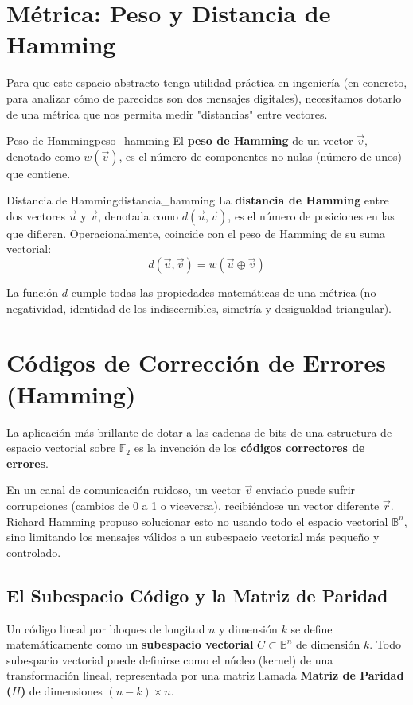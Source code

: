 \section{Métrica: Peso y Distancia de Hamming}

Para que este espacio abstracto tenga utilidad práctica en ingeniería (en concreto, para analizar cómo de parecidos son dos mensajes digitales), necesitamos dotarlo de una métrica que nos permita medir "distancias" entre vectores.

\begin{definicion}{Peso de Hamming}{peso_hamming}
El \textbf{peso de Hamming} de un vector $\vec{v}$, denotado como $w(\vec{v})$, es el número de componentes no nulas (número de unos) que contiene.
\end{definicion}

\begin{definicion}{Distancia de Hamming}{distancia_hamming}
La \textbf{distancia de Hamming} entre dos vectores $\vec{u}$ y $\vec{v}$, denotada como $d(\vec{u}, \vec{v})$, es el número de posiciones en las que difieren. Operacionalmente, coincide con el peso de Hamming de su suma vectorial:
\[ d(\vec{u}, \vec{v}) = w(\vec{u} \oplus \vec{v}) \]
\end{definicion}
La función $d$ cumple todas las propiedades matemáticas de una métrica (no negatividad, identidad de los indiscernibles, simetría y desigualdad triangular).

\section{Códigos de Corrección de Errores (Hamming)}

La aplicación más brillante de dotar a las cadenas de bits de una estructura de espacio vectorial sobre $\mathbb{F}_2$ es la invención de los \textbf{códigos correctores de errores}. 

En un canal de comunicación ruidoso, un vector $\vec{v}$ enviado puede sufrir corrupciones (cambios de 0 a 1 o viceversa), recibiéndose un vector diferente $\vec{r}$. Richard Hamming propuso solucionar esto no usando todo el espacio vectorial $\mathbb{B}^n$, sino limitando los mensajes válidos a un subespacio vectorial más pequeño y controlado.

\subsection{El Subespacio Código y la Matriz de Paridad}
Un código lineal por bloques de longitud $n$ y dimensión $k$ se define matemáticamente como un \textbf{subespacio vectorial} $C \subset \mathbb{B}^n$ de dimensión $k$. Todo subespacio vectorial puede definirse como el núcleo (kernel) de una transformación lineal, representada por una matriz llamada \textbf{Matriz de Paridad ($H$)} de dimensiones $(n-k) \times n$.

